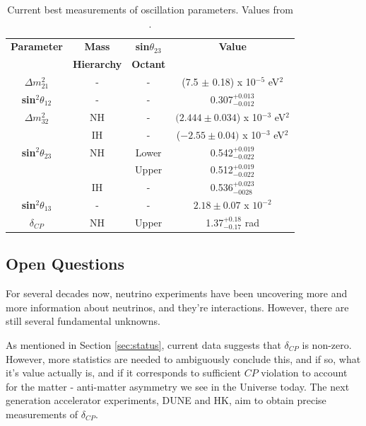 \begin{center}
\begin{table}
\large
\center
\begin{tabular}{ c|c c|| c } 
\hline
\hline
\textbf{Parameter} & \textbf{Mass} & \textbf{sin$\theta_{23}$} & \textbf{Value} \\
 & \textbf{Hierarchy} & \textbf{Octant} & \\
\hline
\hline
\textbf{$\Delta m_{21}^2$} & - & - & (7.5 $\pm$ 0.18) x 10$^{-5}$ eV$^2$\\
\textbf{sin$^{2}\theta_{12}$} & - & - & 0.307$^{+0.013}_{-0.012}$ \\
\hline
\textbf{$\Delta m_{32}^2$} & NH & - & $(2.444 \pm 0.034$) x 10$^{-3}$ eV$^2$ \\
 & IH & - & ($-2.55 \pm 0.04)$ x 10$^{-3}$ eV$^2$\\
\textbf{sin$^{2}\theta_{23}$} & NH & Lower & 0.542$^{+0.019}_{-0.022}$\\
 & & Upper & 0.512$^{+0.019}_{-0.022}$ \\
 & IH & - & 0.536$^{+0.023}_{-0028}$\\
\hline
\textbf{sin$^{2}\theta_{13}$} & - & - & $2.18 \pm 0.07$ x $10^{-2}$\\
\textbf{$\delta_{CP}$} & NH & Upper & 1.37$^{+0.18}_{-0.17}$ rad\\
\hline 
\hline
\end{tabular}
\caption{Current best measurements of oscillation parameters. Values from \cite{pdg}.}
\label{tab:pdg}
\end{table}
\end{center}

\subsection{Open Questions}

For several decades now, neutrino experiments have been uncovering more and more information about neutrinos, and they're interactions. However, there are still several fundamental unknowns. 

As mentioned in Section \ref{sec:status}, current data suggests that $\delta_{CP}$ is non-zero. However, more statistics are needed to ambiguously conclude this, and if so, what it's value actually is, and if it corresponds to sufficient $CP$ violation to account for the matter - anti-matter asymmetry we see in the Universe today. The next generation accelerator experiments, DUNE and HK, aim to obtain precise measurements of $\delta_{CP}$.

